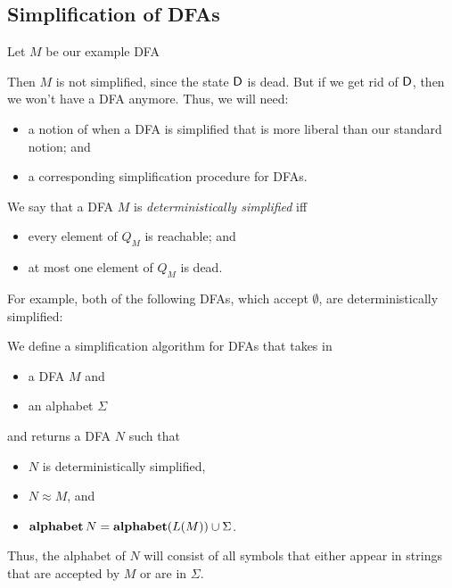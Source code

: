 \subsection{Simplification of DFAs}

Let $M$ be our example DFA
\begin{center}

\end{center}
Then $M$ is not simplified, since the state $\mathsf{D}$ is dead.  But if we
get rid of $\mathsf{D}$, then we won't have a DFA anymore.  Thus, we will
need:
\begin{itemize}
\item a notion of when a DFA is simplified that is more liberal than
  our standard notion; and

\item a corresponding simplification procedure for DFAs.
\end{itemize}
We say that a DFA $M$ is \emph{deterministically simplified} iff
\begin{itemize}
\item every element of $Q_M$ is reachable; and

\item at most one element of $Q_M$ is dead.
\end{itemize}
For example, both of the following DFAs, which accept $\emptyset$,
are deterministically simplified:
\begin{center}

\end{center}

We define a simplification algorithm for DFAs that takes in
\begin{itemize}
\item a DFA $M$ and
\item an alphabet $\Sigma$
\end{itemize}
and returns a DFA $N$ such that
\begin{itemize}
\item $N$ is deterministically simplified,

\item $N\approx M$, and

\item $\mathbf{alphabet}\,N = \mathbf{alphabet}(L(M))\cup\Sigma$.
\end{itemize}
Thus, the alphabet of $N$ will consist of all symbols that
either appear in strings that are accepted by $M$ or are in $\Sigma$.

